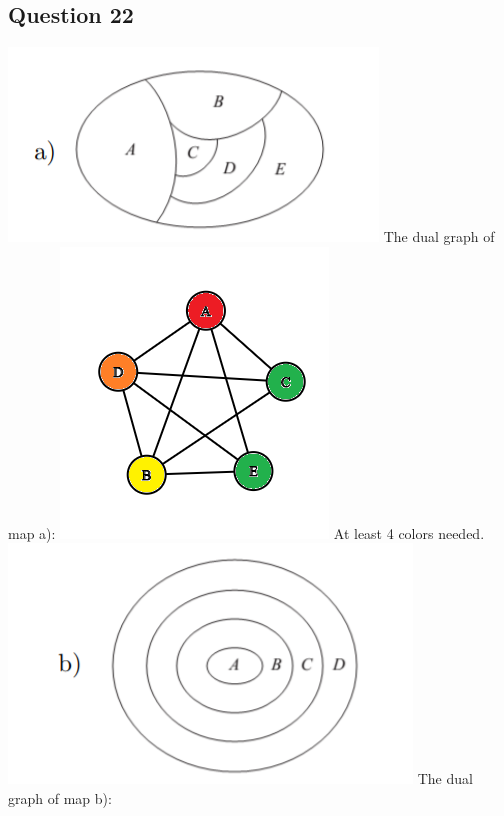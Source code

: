 \documentclass{article}
\begin{document}
\subsection*{Question 22}
\includegraphics[]{Question 22/connectivity_22.a.png}
\newline
The dual graph of map a):
\newline
\includegraphics[]{Question 22/connectivity_22.a.graph.png}
\newline
At least 4 colors needed.
\newline
\includegraphics[]{Question 22/connectivity_22.b.png}
\newline
The dual graph of map b):
\newline
\end{document}
